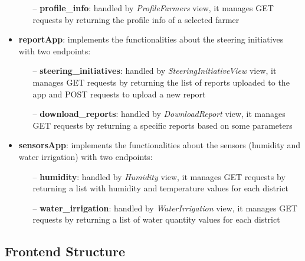 \documentclass[table, 12pt]{article}
\begin{document}
\begin{itemize}
\begin{itemize}
        \item[--] \textbf{profile\_info}: handled by \textit{ProfileFarmers} view, it manages GET requests by returning the profile info of a selected farmer
    \end{itemize}
    \item \textbf{reportApp}: implements the functionalities about the steering initiatives with two endpoints:
    \begin{itemize}
        \item[--] \textbf{steering\_initiatives}: handled by \textit{SteeringInitiativeView} view, it manages GET requests by returning the list of reports uploaded to the app and POST requests to upload a new report
        \item[--] \textbf{download\_reports}: handled by \textit{DownloadReport} view, it manages GET requests by returning a specific reports based on some parameters
    \end{itemize}
    \item \textbf{sensorsApp}: implements the functionalities about the sensors (humidity and water irrigation) with two endpoints:
    \begin{itemize}
        \item[--] \textbf{humidity}: handled by \textit{Humidity} view, it manages GET requests by returning a list with humidity and temperature values for each district
        \item[--] \textbf{water\_irrigation}: handled by \textit{WaterIrrigation} view, it manages GET requests by returning a list of water quantity values for each district
    \end{itemize}
\end{itemize}

\subsection{Frontend Structure}
\end{document}
